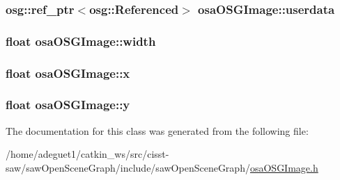 \hypertarget{classosa_o_s_g_image_a612dc68e1eccf9b96a8d2a2976a2d2de}{
\subsubsection[{userdata}]{\setlength{\rightskip}{0pt plus 5cm}osg\-::ref\-\_\-ptr$<$osg\-::\-Referenced$>$ osa\-O\-S\-G\-Image\-::userdata\hspace{0.3cm}{\ttfamily [protected]}}}\label{classosa_o_s_g_image_a612dc68e1eccf9b96a8d2a2976a2d2de}
\hypertarget{classosa_o_s_g_image_a9ba055113d2bcc4ec78db305f16fef4d}{
\subsubsection[{width}]{\setlength{\rightskip}{0pt plus 5cm}float osa\-O\-S\-G\-Image\-::width\hspace{0.3cm}{\ttfamily [protected]}}}\label{classosa_o_s_g_image_a9ba055113d2bcc4ec78db305f16fef4d}
\hypertarget{classosa_o_s_g_image_a44d3e5d8face9e82282a356e4c4c3332}{
\subsubsection[{x}]{\setlength{\rightskip}{0pt plus 5cm}float osa\-O\-S\-G\-Image\-::x\hspace{0.3cm}{\ttfamily [protected]}}}\label{classosa_o_s_g_image_a44d3e5d8face9e82282a356e4c4c3332}
\hypertarget{classosa_o_s_g_image_a6bee81116bbd53706ad648f61b74fc64}{
\subsubsection[{y}]{\setlength{\rightskip}{0pt plus 5cm}float osa\-O\-S\-G\-Image\-::y\hspace{0.3cm}{\ttfamily [protected]}}}\label{classosa_o_s_g_image_a6bee81116bbd53706ad648f61b74fc64}


The documentation for this class was generated from the following file\-:\begin{DoxyCompactItemize}
\item 
/home/adeguet1/catkin\-\_\-ws/src/cisst-\/saw/saw\-Open\-Scene\-Graph/include/saw\-Open\-Scene\-Graph/\hyperlink{osa_o_s_g_image_8h}{osa\-O\-S\-G\-Image.\-h}\end{DoxyCompactItemize}
